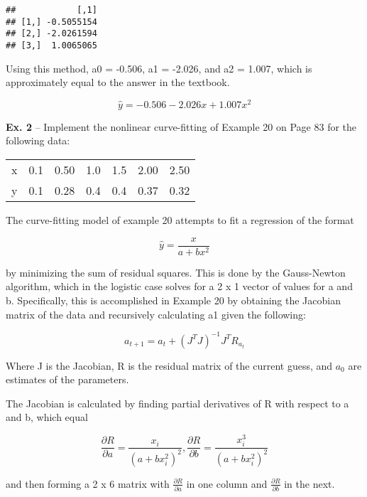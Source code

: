 \documentclass[
]{article}
\begin{document}
\begin{verbatim}
##            [,1]
## [1,] -0.5055154
## [2,] -2.0261594
## [3,]  1.0065065
\end{verbatim}

Using this method, a0 = -0.506, a1 = -2.026, and a2 = 1.007, which is
approximately equal to the answer in the textbook.

\[\hat{y} = -0.506 - 2.026x + 1.007x^2\]

\textbf{Ex. 2} -- Implement the nonlinear curve-fitting of Example 20 on
Page 83 for the following data:

\begin{longtable}[]{@{}lrrrrrr@{}}
\toprule
\endhead
x & 0.1 & 0.50 & 1.0 & 1.5 & 2.00 & 2.50\tabularnewline
y & 0.1 & 0.28 & 0.4 & 0.4 & 0.37 & 0.32\tabularnewline
\bottomrule
\end{longtable}

The curve-fitting model of example 20 attempts to fit a regression of
the format

\[ \hat{y} = \frac{x}{a + bx^2}\]

by minimizing the sum of residual squares. This is done by the
Gauss-Newton algorithm, which in the logistic case solves for a 2 x 1
vector of values for a and b. Specifically, this is accomplished in
Example 20 by obtaining the Jacobian matrix of the data and recursively
calculating a1 given the following:

\[a_{t+1} = a_t + (J^T J)^{-1} J^T R_{a_t}\]

Where J is the Jacobian, R is the residual matrix of the current guess,
and \(a_0\) are estimates of the parameters.

The Jacobian is calculated by finding partial derivatives of R with
respect to a and b, which equal

\[\frac{\partial R}{\partial a} = \frac{x_i}{(a + bx_i^2)^2}, \frac{\partial R}{\partial b} = \frac{x_i^3}{(a + bx_i^2)^2}\]

and then forming a 2 x 6 matrix with \(\frac{\partial R}{\partial a}\)
in one column and \(\frac{\partial R}{\partial b}\) in the next.
\end{document}
